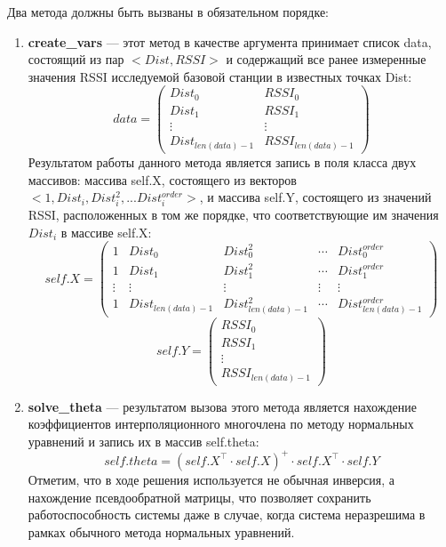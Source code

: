 Два метода должны быть вызваны в обязательном порядке:
\begin{enumerate}
	\item
		{\bf{}create\_vars} --- этот метод в качестве аргумента принимает список data, состоящий из пар $<Dist, RSSI>$ и содержащий все ранее измеренные значения RSSI исследуемой базовой станции в известных точках Dist:
		\begin{equation}
			data = \begin{pmatrix}
				Dist_0 & RSSI_0 \\
				Dist_1 & RSSI_1 \\
				\vdots & \vdots \\
     Dist_{len(data)-1} & RSSI_{len(data)-1}
			\end{pmatrix}
			\label{eq:data-create-vars}
		\end{equation}
		Результатом работы данного метода является запись в поля класса двух массивов: массива self.X, состоящего из векторов $<1, Dist_i, Dist_i^2, ... Dist_i^{order}>$, и массива self.Y, состоящего из значений RSSI, расположенных в том же порядке, что соответствующие им значения $Dist_i$ в массиве self.X:
		\begin{equation}
			self.X = \begin{pmatrix}
				1 & Dist_0 & Dist_0^2 & \cdots & Dist_0^{order} \\
				1 & Dist_1 & Dist_1^2 & \cdots & Dist_1^{order} \\
      \vdots & \vdots & \vdots & \vdots & \vdots \\
				       1 & Dist_{len(data)-1} & Dist_{len(data)-1}^2 & \cdots & Dist_{len(data)-1}^{order}
			\end{pmatrix}
			\label{eq:self-x-create-vars}
		\end{equation}
		\begin{equation}
			self.Y = \begin{pmatrix}
				RSSI_0 \\
				RSSI_1 \\
				\vdots \\
				RSSI_{len(data)-1}
			\end{pmatrix}
			\label{eq:self-y-create-vars}
		\end{equation}
	\item
		{\bf{}solve\_theta} --- результатом вызова этого метода является нахождение коэффициентов интерполяционного многочлена по методу нормальных уравнений и запись их в массив self.theta:
		\begin{equation}
			self.theta = (self.X^\intercal \cdot self.X)^{+} \cdot self.X^\intercal \cdot self.Y
			\label{eq:solve-theta}
		\end{equation}
		Отметим, что в ходе решения используется не обычная инверсия, а нахождение псевдообратной матрицы, что позволяет сохранить работоспособность системы даже в случае, когда система неразрешима в рамках обычного метода нормальных уравнений.
\end{enumerate}

